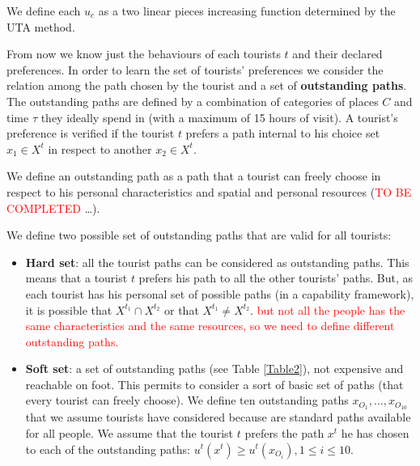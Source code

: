 \documentclass[a4paper]{article}
\begin{document}
We define each $u_c$ as a two linear pieces increasing function determined by the UTA method.

From now we know just the behaviours of each tourists $t$ and their declared preferences. In order to learn the set of tourists' preferences we consider the relation among the path chosen by the tourist and a set of \textbf{outstanding paths}. The outstanding paths are defined by a combination of categories of places $C$ and time $\tau$ they ideally spend in (with a maximum of 15 hours of visit). A tourist's preference is verified if the tourist $t$ prefers a path internal to his choice set $x_1 \in X^t$ in respect to another $x_2 \in X^t$.
\begin{mydef}
We define an outstanding path as a path that a tourist can freely choose in respect to his personal characteristics and spatial and personal resources (\textcolor{red}{TO BE COMPLETED} \dots).
\end{mydef}
We define two possible set of outstanding paths that are valid for all tourists:
                                            \begin{itemize}
                                                \item \textbf{Hard set}: all the tourist paths can be considered as outstanding paths. This means that a tourist $t$ prefers his path to all the other tourists' paths. But, as each tourist has his personal set of possible paths (in a capability framework), it is possible that $X^{t_1}\cap X^{t_2}$ or that $X^{t_1}\neq X^{t_2}$.
                                                    \subitem {-} \textcolor{red}{but not all the people has the same characteristics and the same resources, so we need to define different outstanding paths.}
                                                \item \textbf{Soft set}: a set of outstanding paths (see Table  \ref{Table2}), not expensive and reachable on foot. This permits to consider a sort of basic set of paths (that every tourist can freely choose). We define ten outstanding paths $x_{O_1}, \ldots, x_{O_{10}}$ that we assume tourists have considered because are standard paths available for all people. We assume that the tourist $t$ prefers the path $x^t$ he has chosen to each of the outstanding paths: $u^t(x^t) \geq u^t(x_{O_i}), 1 \leq  i \leq 10$.
                                               \end{itemize}
\end{document}
